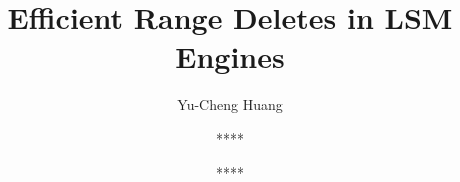 \documentclass[sigconf]{acmart}
\begin{document}
\title{Efficient Range Deletes in LSM Engines}

\author{Yu-Cheng Huang}

\author{****}

\author{****}










\end{document}
